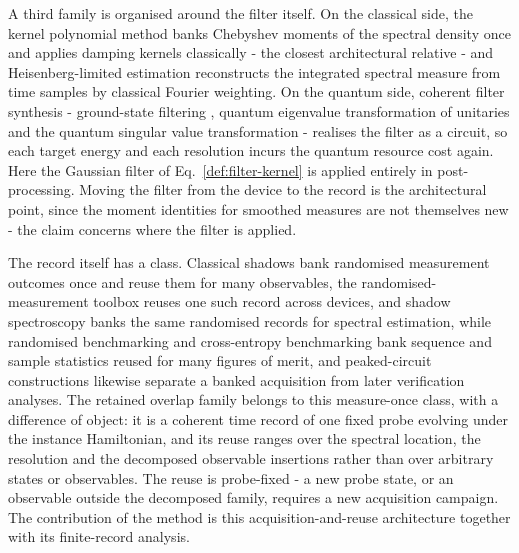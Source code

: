 A third family is organised around the filter itself. On the classical side, the kernel polynomial method \cite{weisse2006kpm} banks Chebyshev moments of the spectral density once and applies damping kernels classically - the closest architectural relative - and Heisenberg-limited estimation \cite{lin2022heisenberg} reconstructs the integrated spectral measure from time samples by classical Fourier weighting. On the quantum side, coherent filter synthesis - ground-state filtering \cite{ge2019filter}, quantum eigenvalue transformation of unitaries \cite{dong2022qetu} and the quantum singular value transformation \cite{martyn2021grandunification} - realises the filter as a circuit, so each target energy and each resolution incurs the quantum resource cost again. Here the Gaussian filter of Eq.~\eqref{def:filter-kernel} is applied entirely in post-processing. Moving the filter from the device to the record is the architectural point, since the moment identities for smoothed measures are not themselves new - the claim concerns where the filter is applied.

The record itself has a class. Classical shadows \cite{huang2020predicting} bank randomised measurement outcomes once and reuse them for many observables, the randomised-measurement toolbox \cite{elben2020crossplatform} reuses one such record across devices, and shadow spectroscopy \cite{chan2025shadow} banks the same randomised records for spectral estimation, while randomised benchmarking \cite{knill2008rb} and cross-entropy benchmarking \cite{gao2024xeblimits} bank sequence and sample statistics reused for many figures of merit, and peaked-circuit constructions \cite{aaronson2024peaked} likewise separate a banked acquisition from later verification analyses. The retained overlap family belongs to this measure-once class, with a difference of object: it is a coherent time record of one fixed probe evolving under the instance Hamiltonian, and its reuse ranges over the spectral location, the resolution and the decomposed observable insertions rather than over arbitrary states or observables. The reuse is probe-fixed - a new probe state, or an observable outside the decomposed family, requires a new acquisition campaign. The contribution of the method is this acquisition-and-reuse architecture together with its finite-record analysis.
